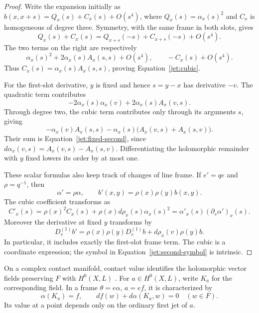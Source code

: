 \begin{proof}
Write the expansion initially as
$b(x,x+s)=Q_x(s)+C_x(s)+O(s^4)$, where
$Q_x(s)=\alpha_x(s)^2$ and $C_x$ is homogeneous of degree three.
Symmetry, with the same frame in both slots, gives
\[
Q_x(s)+C_x(s)
=Q_{x+s}(-s)+C_{x+s}(-s)+O(s^4).
\]
The two terms on the right are respectively
\[
\alpha_x(s)^2+2\alpha_x(s)A_x(s,s)+O(s^4),
\qquad -C_x(s)+O(s^4).
\]
Thus $C_x(s)=\alpha_x(s)A_x(s,s)$, proving
Equation~\eqref{jet:cubic}.

For the first-slot derivative, $y$ is fixed and hence $s=y-x$
has derivative $-v$. The quadratic term contributes
\[
-2\alpha_x(s)\alpha_x(v)+2\alpha_x(s)A_x(v,s).
\]
Through degree two, the cubic term contributes only through its
arguments $s$, giving
\[
-\alpha_x(v)A_x(s,s)
-\alpha_x(s)\bigl(A_x(v,s)+A_x(s,v)\bigr).
\]
Their sum is Equation~\eqref{jet:fixed-second}, since
$d\alpha_x(v,s)=A_x(v,s)-A_x(s,v)$. Differentiating the holomorphic
remainder with $y$ fixed lowers its order by at most one.

These scalar formulas also keep track of changes of line frame.
If $e'=q e$ and $\rho=q^{-1}$, then
\[
\alpha'=\rho\alpha,
\qquad b'(x,y)=\rho(x)\rho(y)b(x,y).
\]
The cubic coefficient transforms as
\[
C'_x(s)=\rho(x)^2 C_x(s)
+\rho(x)d\rho_x(s)\alpha_x(s)^2
=\alpha'_x(s)(\partial_s\alpha')_x(s).
\]
Moreover the derivative at fixed $y$ transforms by
\[
D^{(1)}_v b'
=\rho(x)\rho(y)D^{(1)}_v b
+d\rho_x(v)\rho(y)b.
\]
In particular, it includes exactly the first-slot frame term.
The cubic is a coordinate expression; the symbol in
Equation~\eqref{jet:second-symbol} is intrinsic.
\end{proof}

\begin{lemma}\label{jet:hamiltonian}
On a complex contact manifold, contact value identifies the
holomorphic vector fields preserving $F$ with $H^0(X,L)$
\cite[Proposition~2.1]{LeBrun1995}.
For $a\in H^0(X,L)$, write $K_a$ for the corresponding field.
In a frame $\theta=e\alpha$, $a=e f$, it is characterized by
\begin{equation}\label{jet:hamiltonian-equations}
\alpha(K_a)=f,
\qquad df(w)+d\alpha(K_a,w)=0\quad(w\in F).
\end{equation}
Its value at a point depends only on the ordinary first jet of $a$.
\end{lemma}

